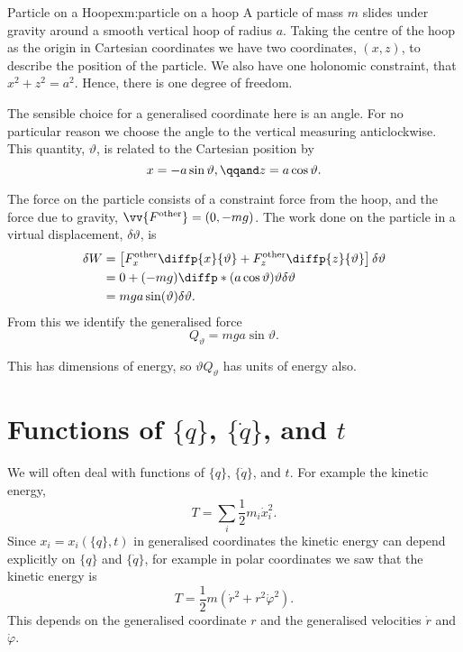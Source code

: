 \documentclass[fleqn]{NotesClass}
\newcommand*{\other}{\mathrm{other}}
\begin{document}
    \begin{exm}{Particle on a Hoop}{exm:particle on a hoop}
        A particle of mass \(m\) slides under gravity around a smooth vertical hoop of radius \(a\).
        Taking the centre of the hoop as the origin in Cartesian coordinates we have two coordinates, \((x, z)\), to describe the position of the particle.
        We also have one holonomic constraint, that \(x^2 + z^2 = a^2\).
        Hence, there is one degree of freedom.
        
        The sensible choice for a generalised coordinate here is an angle.
        For no particular reason we choose the angle to the vertical measuring anticlockwise.
        This quantity, \(\vartheta\), is related to the Cartesian position by
        \begin{equation}
            x = -a\sin\vartheta, \qqand z = a\cos\vartheta.
        \end{equation}
    
        The force on the particle consists of a constraint force from the hoop, and the force due to gravity, \(\vv{F^{\other}} = (0, -mg)\).
        The work done on the particle in a virtual displacement, \(\delta\vartheta\), is
        \begin{align}
            \delta W &= \left[ F_x^{\other} \diffp{x}{\vartheta} + F_z^{\other} \diffp{z}{\vartheta} \right]\delta\vartheta\\
            &= 0 + (-mg)\diffp*{(a\cos\vartheta)}{\vartheta}\delta\vartheta\\
            &= mga\sin(\vartheta)\delta\vartheta.
        \end{align}
        From this we identify the generalised force
        \begin{equation}
            Q_{\vartheta} = mga\sin\vartheta.
        \end{equation}
        
        This has dimensions of energy, so \(\vartheta Q_\vartheta\) has units of energy also.
    \end{exm}
    
    \section{Functions of \texorpdfstring{\(\{q\}\), \(\{\dot{q}\}\), and \(t\)}{\{q\}, \{q-dot\}, and t}}
    We will often deal with functions of \(\{q\}\), \(\{\dot{q}\}\), and \(t\).
    For example the kinetic energy,
    \begin{equation}
        T = \sum_i \frac{1}{2}m_i\dot{x}_i^2.
    \end{equation}
    Since \(x_i = x_i(\{q\}, t)\) in generalised coordinates the kinetic energy can depend explicitly on \(\{q\}\) and \(\{\dot{q}\}\), for example in polar coordinates we saw that the kinetic energy is
    \begin{equation}
        T = \frac{1}{2}m(\dot{r}^2 + r^2\dot{\varphi}^2).
    \end{equation}
    This depends on the generalised coordinate \(r\) and the generalised velocities \(\dot{r}\) and \(\dot{\varphi}\).
    
\end{document}
